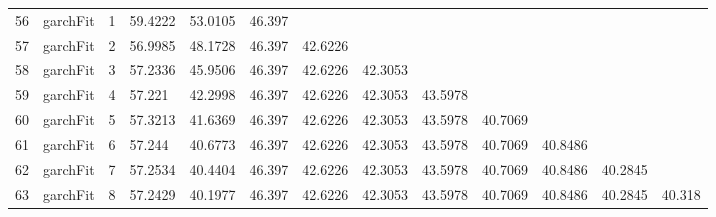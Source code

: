 \documentclass[10pt,a4paper]{article}
\begin{document}
\begin{table}[ht]
\begin{tabular}{rlrllllllllll}
  56 & garchFit &     1 & 59.4222 & 53.0105 & 46.397 &  &  &  &  &  &  &  \\ 
  57 & garchFit &     2 & 56.9985 & 48.1728 & 46.397 & 42.6226 &  &  &  &  &  &  \\ 
  58 & garchFit &     3 & 57.2336 & 45.9506 & 46.397 & 42.6226 & 42.3053 &  &  &  &  &  \\ 
  59 & garchFit &     4 & 57.221 & 42.2998 & 46.397 & 42.6226 & 42.3053 & 43.5978 &  &  &  &  \\ 
  60 & garchFit &     5 & 57.3213 & 41.6369 & 46.397 & 42.6226 & 42.3053 & 43.5978 & 40.7069 &  &  &  \\ 
  61 & garchFit &     6 & 57.244 & 40.6773 & 46.397 & 42.6226 & 42.3053 & 43.5978 & 40.7069 & 40.8486 &  &  \\ 
  62 & garchFit &     7 & 57.2534 & 40.4404 & 46.397 & 42.6226 & 42.3053 & 43.5978 & 40.7069 & 40.8486 & 40.2845 &  \\ 
  63 & garchFit &     8 & 57.2429 & 40.1977 & 46.397 & 42.6226 & 42.3053 & 43.5978 & 40.7069 & 40.8486 & 40.2845 & 40.318 \\ 
   \hline
\end{tabular}
\end{table}
\end{document}
